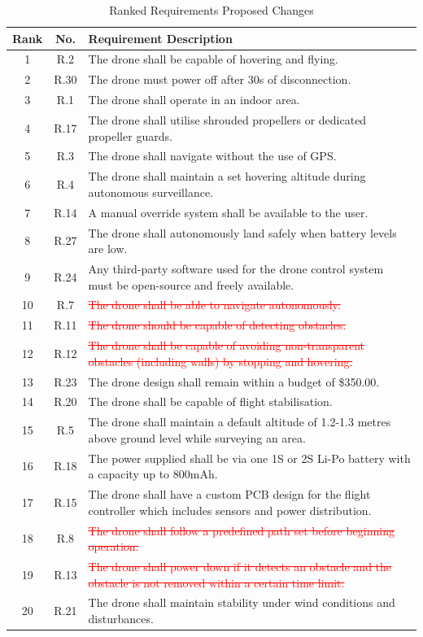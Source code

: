 \begin{table}[H]
\centering
\caption{Ranked Requirements Proposed Changes}
\begin{tabular}{|c|c|p{11cm}|}
\hline
\textbf{Rank} & \textbf{No.} & \textbf{Requirement Description} \\ \hline
1 & R.2 & The drone shall be capable of hovering and flying. \\ \hline
2 & R.30 & The drone must power off after 30s of disconnection. \\ \hline
3 & R.1 & The drone shall operate in an indoor area. \\ \hline
4 & R.17 & The drone shall utilise shrouded propellers or dedicated propeller guards. \\ \hline
5 & R.3 & The drone shall navigate without the use of GPS. \\ \hline
6 & R.4 & The drone shall maintain a set hovering altitude during autonomous surveillance. \\ \hline
7 & R.14 & A manual override system shall be available to the user. \\ \hline
8 & R.27 & The drone shall autonomously land safely when battery levels are low. \\ \hline
9 & R.24 & Any third-party software used for the drone control system must be open-source and freely available. \\ \hline
10 & R.7 & \textcolor{red}{\sout{The drone shall be able to navigate autonomously.}} \\ \hline
11 & R.11 & \textcolor{red}{\sout{The drone should be capable of detecting obstacles.}} \\ \hline
12 & R.12 & \textcolor{red}{\sout{The drone shall be capable of avoiding non-transparent obstacles (including walls) by stopping and hovering.}} \\ \hline
13 & R.23 & The drone design shall remain within a budget of \$350.00. \\ \hline
14 & R.20 & The drone shall be capable of flight stabilisation. \\ \hline
15 & R.5 & The drone shall maintain a default altitude of 1.2-1.3 metres above ground level while surveying an area. \\ \hline
16 & R.18 & The power supplied shall be via one 1S or 2S Li-Po battery with a capacity up to 800mAh. \\ \hline
17 & R.15 & The drone shall have a custom PCB design for the flight controller which includes sensors and power distribution. \\ \hline
18 & R.8 & \textcolor{red}{\sout{The drone shall follow a predefined path set before beginning operation.}} \\ \hline
19 & R.13 & \textcolor{red}{\sout{The drone shall power down if it detects an obstacle and the obstacle is not removed within a certain time limit.}} \\ \hline
20 & R.21 & The drone shall maintain stability under wind conditions and disturbances. \\ \hline
\end{tabular}
\end{table}

